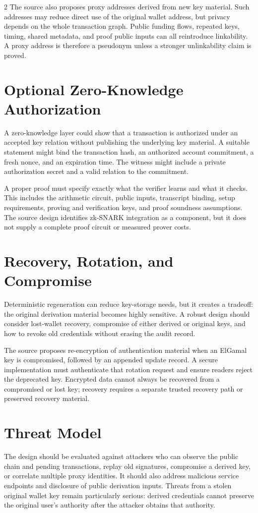 \documentclass[10pt,letterpaper]{article}
\begin{document}
\begin{multicols}{2}
The source also proposes proxy addresses derived from new key material. Such addresses may reduce direct use of the original wallet address, but privacy depends on the whole transaction graph. Public funding flows, repeated keys, timing, shared metadata, and proof public inputs can all reintroduce linkability. A proxy address is therefore a pseudonym unless a stronger unlinkability claim is proved.

\section{Optional Zero-Knowledge Authorization}
A zero-knowledge layer could show that a transaction is authorized under an accepted key relation without publishing the underlying key material. A suitable statement might bind the transaction hash, an authorized account commitment, a fresh nonce, and an expiration time. The witness might include a private authorization secret and a valid relation to the commitment.

A proper proof must specify exactly what the verifier learns and what it checks. This includes the arithmetic circuit, public inputs, transcript binding, setup requirements, proving and verification keys, and proof soundness assumptions. The source design identifies zk-SNARK integration as a component, but it does not supply a complete proof circuit or measured prover costs.

\section{Recovery, Rotation, and Compromise}
Deterministic regeneration can reduce key-storage needs, but it creates a tradeoff: the original derivation material becomes highly sensitive. A robust design should consider lost-wallet recovery, compromise of either derived or original keys, and how to revoke old credentials without erasing the audit record.

The source proposes re-encryption of authentication material when an ElGamal key is compromised, followed by an appended update record. A secure implementation must authenticate that rotation request and ensure readers reject the deprecated key. Encrypted data cannot always be recovered from a compromised or lost key; recovery requires a separate trusted recovery path or preserved recovery material.

\section{Threat Model}
The design should be evaluated against attackers who can observe the public chain and pending transactions, replay old signatures, compromise a derived key, or correlate multiple proxy identities. It should also address malicious service endpoints and disclosure of public derivation inputs. Threats from a stolen original wallet key remain particularly serious: derived credentials cannot preserve the original user's authority after the attacker obtains that authority.


\end{multicols}
\end{document}
